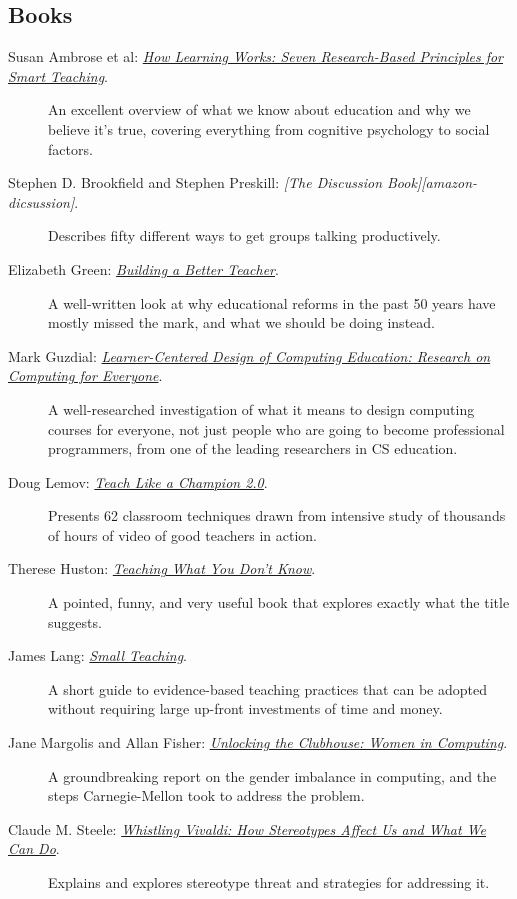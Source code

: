 \subsection{Books}\label{books}

\begin{description}
\item[Susan Ambrose et al:
\emph{\href{http://www.amazon.com/How-Learning-Works-Research-Based-Jossey-Bass/dp/0470484101/}{How
Learning Works: Seven Research-Based Principles for Smart Teaching}}.]
An excellent overview of what we know about education and why we believe
it's true, covering everything from cognitive psychology to social
factors.
\item[Stephen D. Brookfield and Stephen Preskill: \emph{{[}The
Discussion Book{]}{[}amazon-dicsussion{]}}.]
Describes fifty different ways to get groups talking productively.
\item[Elizabeth Green:
\emph{\href{http://www.amazon.com/Building-Better-Teacher-Teaching-Everyone/dp/0393081591}{Building
a Better Teacher}}.]
A well-written look at why educational reforms in the past 50 years have
mostly missed the mark, and what we should be doing instead.
\item[Mark Guzdial:
\emph{\href{http://www.amazon.com/Learner-Centered-Design-Computing-Education-Human-Centered/dp/1627053514/}{Learner-Centered
Design of Computing Education: Research on Computing for Everyone}}.]
A well-researched investigation of what it means to design computing
courses for everyone, not just people who are going to become
professional programmers, from one of the leading researchers in CS
education.
\item[Doug Lemov:
\emph{\href{http://www.amazon.com/Teach-Like-Champion-2-0-Techniques/dp/1118901851/}{Teach
Like a Champion 2.0}}.]
Presents 62 classroom techniques drawn from intensive study of thousands
of hours of video of good teachers in action.
\item[Therese Huston:
\emph{\href{http://www.amazon.com/Teaching-What-You-Dont-Know/dp/0674066170/}{Teaching
What You Don't Know}}.]
A pointed, funny, and very useful book that explores exactly what the
title suggests.
\item[James Lang:
\emph{\href{https://www.amazon.com/Small-Teaching-Everyday-Lessons-Learning/dp/1118944496/}{Small
Teaching}}.]
A short guide to evidence-based teaching practices that can be adopted
without requiring large up-front investments of time and money.
\item[Jane Margolis and Allan Fisher:
\emph{\href{http://www.amazon.com/Unlocking-Clubhouse-Computing-Jane-Margolis/dp/0262632691/}{Unlocking
the Clubhouse: Women in Computing}}.]
A groundbreaking report on the gender imbalance in computing, and the
steps Carnegie-Mellon took to address the problem.
\item[Claude M. Steele:
\emph{\href{http://www.amazon.com/Whistling-Vivaldi-Stereotypes-Affect-Issues/dp/0393339726/}{Whistling
Vivaldi: How Stereotypes Affect Us and What We Can Do}}.]
Explains and explores stereotype threat and strategies for addressing
it.
\end{description}

